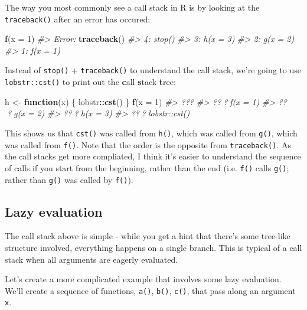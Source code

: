 \documentclass[]{book}
\newenvironment{Shaded}{\begin{snugshade}}{\end{snugshade}}
\newcommand{\CommentTok}[1]{\textcolor[rgb]{0.56,0.35,0.01}{\textit{#1}}}
\newcommand{\ControlFlowTok}[1]{\textcolor[rgb]{0.13,0.29,0.53}{\textbf{#1}}}
\newcommand{\DataTypeTok}[1]{\textcolor[rgb]{0.13,0.29,0.53}{#1}}
\newcommand{\DecValTok}[1]{\textcolor[rgb]{0.00,0.00,0.81}{#1}}
\newcommand{\KeywordTok}[1]{\textcolor[rgb]{0.13,0.29,0.53}{\textbf{#1}}}
\newcommand{\NormalTok}[1]{#1}
\newcommand{\OperatorTok}[1]{\textcolor[rgb]{0.81,0.36,0.00}{\textbf{#1}}}
\newcommand{\StringTok}[1]{\textcolor[rgb]{0.31,0.60,0.02}{#1}}
\theoremstyle{definition}
\theoremstyle{definition}
\theoremstyle{definition}
\theoremstyle{remark}
\begin{document}
The way you most commonly see a call stack in R is by looking at the
\texttt{traceback()} after an error has occured:

\begin{Shaded}
\begin{Highlighting}[]
\KeywordTok{f}\NormalTok{(}\DataTypeTok{x =} \DecValTok{1}\NormalTok{)}
\CommentTok{#> Error:}
\KeywordTok{traceback}\NormalTok{()}
\CommentTok{#> 4: stop()}
\CommentTok{#> 3: h(x = 3) }
\CommentTok{#> 2: g(x = 2)}
\CommentTok{#> 1: f(x = 1)}
\end{Highlighting}
\end{Shaded}

Instead of \texttt{stop()} + \texttt{traceback()} to understand the call
stack, we're going to use \texttt{lobstr::cst()} to print out the
\textbf{c}all \textbf{s}tack \textbf{t}ree:

\begin{Shaded}
\begin{Highlighting}[]
\NormalTok{h <-}\StringTok{ }\ControlFlowTok{function}\NormalTok{(x) \{}
\NormalTok{  lobstr}\OperatorTok{::}\KeywordTok{cst}\NormalTok{()}
\NormalTok{\}}
\KeywordTok{f}\NormalTok{(}\DataTypeTok{x =} \DecValTok{1}\NormalTok{)}
\CommentTok{#> ???}
\CommentTok{#> ???f(x = 1)}
\CommentTok{#>   ???g(x = 2)}
\CommentTok{#>     ???h(x = 3)}
\CommentTok{#>       ???lobstr::cst()}
\end{Highlighting}
\end{Shaded}

This shows us that \texttt{cst()} was called from \texttt{h()}, which
was called from \texttt{g()}, which was called from \texttt{f()}. Note
that the order is the opposite from \texttt{traceback()}. As the call
stacks get more compliated, I think it's easier to understand the
sequence of calls if you start from the beginning, rather than the end
(i.e. \texttt{f()} calls \texttt{g()}; rather than \texttt{g()} was
called by \texttt{f()}).

\hypertarget{lazy-evaluation-1}{%
\subsection{Lazy evaluation}\label{lazy-evaluation-1}}

The call stack above is simple - while you get a hint that there's some
tree-like structure involved, everything happens on a single branch.
This is typical of a call stack when all arguments are eagerly
evaluated.

Let's create a more complicated example that involves some lazy
evaluation. We'll create a sequence of functions, \texttt{a()},
\texttt{b()}, \texttt{c()}, that pass along an argument \texttt{x}.
\end{document}
